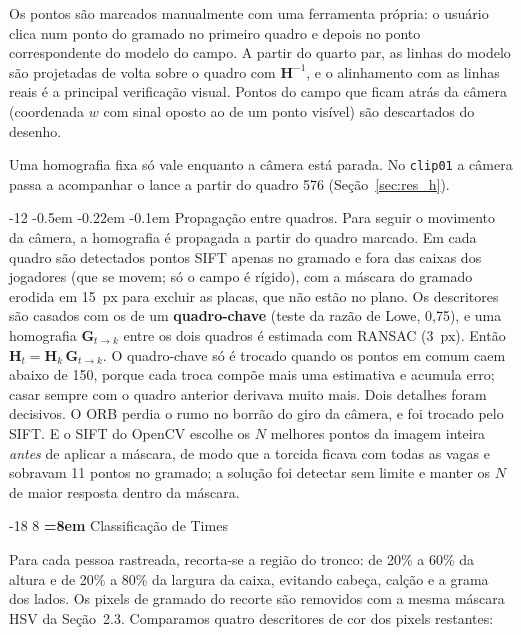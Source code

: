\documentclass[12pt]{article}
\makeatletter
\renewcommand\subsection{\@startsection{subsection}{2}{\z@}%
                       {-18\p@ \@plus -4\p@ \@minus -4\p@}%
                       {8\p@ \@plus 4\p@ \@minus 4\p@}%
                       {\normalfont\normalsize\bfseries\boldmath
                        \rightskip=\z@ \@plus 8em\pretolerance=10000 }}
\renewcommand\paragraph{\@startsection{paragraph}{4}{\z@}%
                       {-12\p@ \@plus -4\p@ \@minus -4\p@}%
                       {-0.5em \@plus -0.22em \@minus -0.1em}%
                       {\normalfont\normalsize\itshape}}
\makeatother
\begin{document}
Os pontos são marcados manualmente com uma ferramenta própria: o usuário clica num
ponto do gramado no primeiro quadro e depois no ponto correspondente do modelo do
campo. A partir do quarto par, as linhas do modelo são projetadas de volta sobre o
quadro com $\mathbf{H}^{-1}$, e o alinhamento com as linhas reais é a principal
verificação visual. Pontos do campo que ficam atrás da câmera (coordenada $w$ com
sinal oposto ao de um ponto visível) são descartados do desenho.

Uma homografia fixa só vale enquanto a câmera está parada. No \texttt{clip01} a
câmera passa a acompanhar o lance a partir do quadro 576 (Seção~\ref{sec:res_h}).

\paragraph{Propagação entre quadros.} Para seguir o movimento da câmera, a homografia
é propagada a partir do quadro marcado. Em cada quadro são detectados pontos
SIFT \cite{lowe2004} apenas no gramado e fora das caixas dos jogadores (que se
movem; só o campo é rígido), com a máscara do gramado erodida em 15~px para excluir
as placas, que não estão no plano. Os descritores são casados com os de um
\textbf{quadro-chave} (teste da razão de Lowe, 0,75), e uma homografia
$\mathbf{G}_{t\to k}$ entre os dois quadros é estimada com RANSAC (3~px). Então
$\mathbf{H}_t = \mathbf{H}_k\,\mathbf{G}_{t\to k}$. O quadro-chave só é trocado quando
os pontos em comum caem abaixo de 150, porque cada troca compõe mais uma estimativa
e acumula erro; casar sempre com o quadro anterior derivava muito mais. Dois
detalhes foram decisivos. O ORB perdia o rumo no borrão do giro da câmera, e foi
trocado pelo SIFT. E o SIFT do OpenCV escolhe os $N$ melhores pontos da imagem
inteira \emph{antes} de aplicar a máscara, de modo que a torcida ficava com todas as
vagas e sobravam 11 pontos no gramado; a solução foi detectar sem limite e manter
os $N$ de maior resposta dentro da máscara.

\subsection{Classificação de Times}

Para cada pessoa rastreada, recorta-se a região do tronco: de 20\% a 60\% da altura
e de 20\% a 80\% da largura da caixa, evitando cabeça, calção e a grama dos lados.
Os pixels de gramado do recorte são removidos com a mesma máscara HSV da
Seção~2.3. Comparamos quatro descritores de cor dos pixels restantes:
\end{document}
